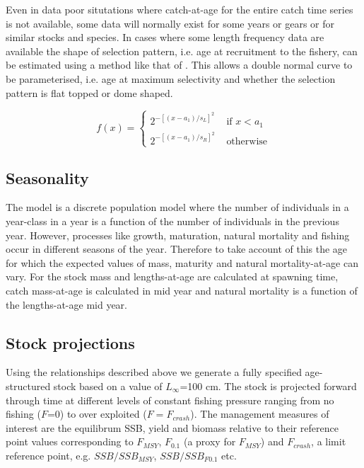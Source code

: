 \documentclass[%
nonumbib,      %
%
]{nrc1}                          %
\begin{document}
\begin{description}
Even in data poor situtations where catch-at-age for the entire catch time series is not available, some data will normally exist for 
some years or gears or for similar stocks and species. In cases where some length frequency data are available the shape of selection pattern, i.e.
age at recruitment to the fishery, can be estimated using a method like that of \cite{wetherall1987estimating}. 
This allows
a double normal curve to be parameterised, i.e. age at maximum selectivity and whether the selection pattern is flat topped or dome shaped.

\begin{equation}
f(x) = \left\{ \begin{array}{rl}
 2^{-[(x-a_1)/s_L]^2} &\mbox{ if $x<a_1$} \\
 2^{-[(x-a_1)/s_R]^2} &\mbox{ otherwise}
       \end{array} \right.
\end{equation}
 
\end{description}

\subsection{Seasonality}

The model is a discrete population model where the number of individuals in a year-class in a year is a function of the number of individuals in the previous year.
However, processes like growth, maturation, natural mortality and fishing occur in different seasons of the year. Therefore to take account of this the age for which
the expected values of mass, maturity and natural mortality-at-age can vary.
For the stock mass and lengths-at-age are calculated at spawning time, catch mass-at-age is calculated in mid year and natural mortality is a function of the lengths-at-age 
mid year.  

\subsection{Stock projections}
Using the relationships described above we generate a fully specified age-structured stock based on a value of $L_{\infty}$=100 cm. The stock is projected
forward through time at different levels of constant fishing pressure ranging from no fishing ($F$=0) to over exploited ($F=F_{crash}$).
The management measures of interest are the equilibrum SSB, yield and biomass relative to their reference point values corresponding to
$F_{MSY}$, $F_{0.1}$ (a proxy for $F_{MSY}$) and $F_{crash}$, a limit reference point, e.g. $SSB / SSB_{MSY}$, $SSB / SSB_{F0.1}$ etc.
\end{document}
